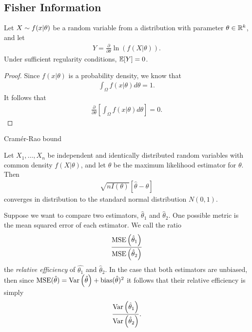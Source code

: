 \subsection{Fisher Information}

\begin{prop}
    Let $X \sim f(x|\theta)$ be a random variable from a distribution with parameter $\theta \in \mathbb{R}^k$, and let
    \begin{align*}
        Y = \frac{\partial}{\partial \theta}\ln\left(f(X|\theta)\right).
    \end{align*}
    Under sufficient regularity conditions, $\operatorname{\mathbb{E}}\!\left[{Y}\right] = 0$.
\end{prop}

\begin{proof}
    Since $f(x|\theta)$ is a probability density, we know that
    \begin{align*}
        \int_{\Omega}f(x|\theta)d\theta = 1.
    \end{align*}
    It follows that
    \begin{align*}
        \frac{\partial}{\partial \theta}\left[\int_{\Omega}f(x|\theta)d\theta\right] = 0.
    \end{align*}
\end{proof}

\begin{thm}
    Cram\'er-Rao bound
\end{thm}

\begin{thm}
    Let $X_1, \ldots, X_n$ be independent and identically distributed random variables with common density $f(X|\theta)$, and let $\hat{\theta}$ be the maximum likelihood estimator for $\theta$. Then
    \begin{align*}
        \sqrt{nI(\theta)}\left[\hat{\theta} - \theta\right]
    \end{align*}
    converges in distribution to the standard normal distribution $N(0, 1)$.
\end{thm}

\begin{defn}
    Suppose we want to compare two estimators, $\hat{\theta}_1$ and $\hat{\theta}_2$. One possible metric is the mean squared error of each estimator. We call the ratio
    \begin{align*}
        \frac{\operatorname{MSE}\left({\hat{\theta}_1}\right)}{\operatorname{MSE}\left({\hat{\theta}_2}\right)}
    \end{align*}
    the \emph{relative efficiency} of $\hat{\theta_1}$ and $\hat{\theta}_2$. In the case that both estimators are unbiased, then since $\textrm{MSE}(\hat{\theta}) = \operatorname{Var}\left(\hat{\theta}\right) + \textrm{bias}(\hat{\theta})^2$ it follows that their relative efficiency is simply
    \begin{align*}
        \frac{\operatorname{Var}\left(\hat{\theta}_1\right)}{\operatorname{Var}\left(\hat{\theta}_2\right)}.
    \end{align*}
\end{defn}

